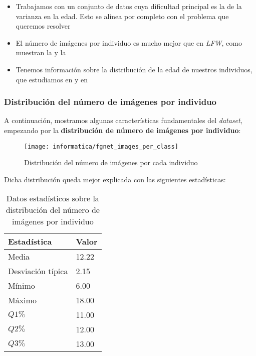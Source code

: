 \begin{itemize}
    \item Trabajamos con un conjunto de datos cuya dificultad principal es la de la varianza en la edad. Esto se alinea por completo con el problema que queremos resolver
    \item El número de imágenes por individuo es mucho mejor que en \textit{LFW}, como muestran la  y la 
    \item Tenemos información sobre la distribución de la edad de nuestros individuos, que estudiamos en  y en 
\end{itemize}

\subsubsection{Distribución del número de imágenes por individuo}

A continuación, mostramos algunas características fundamentales del \textit{dataset}, empezando por la \textbf{distribución de número de imágenes por individuo}:

\begin{figure}[H]
    \centering
    \texttt{[image: informatica/fgnet\_images\_per\_class]}
    \caption{Distribución del número de imágenes por cada individuo}
    \label{img:fgnet_images_per_class}
\end{figure}

Dicha distribución queda mejor explicada con las siguientes estadísticas:

\begin{table}[H]
\centering
\begin{tabular}{|l|l|}
    \hline
    \textbf{Estadística} & \textbf{Valor} \\
    \hline

    Media             & 12.22 \\
    Desviación típica & 2.15  \\
    Mínimo            & 6.00 \\
    Máximo            & 18.00 \\
    $Q1 \%$           & 11.00 \\
    $Q2 \%$           & 12.00 \\
    $Q3 \%$           & 13.00 \\

    \hline

\end{tabular}
\caption{Datos estadísticos sobre la distribución del número de imágenes por individuo}
\label{table:fgnet_images_per_class}
\end{table}

